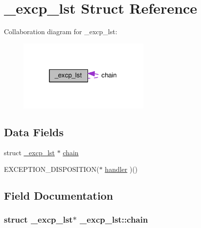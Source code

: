 \hypertarget{struct__excp__lst}{}\section{\+\_\+excp\+\_\+lst Struct Reference}
\label{struct__excp__lst}


Collaboration diagram for \+\_\+excp\+\_\+lst\+:\nopagebreak
\begin{figure}[H]
\begin{center}
\leavevmode
\includegraphics[width=184pt]{struct__excp__lst__coll__graph}
\end{center}
\end{figure}
\subsection*{Data Fields}
\begin{DoxyCompactItemize}
\item 
struct \hyperlink{struct__excp__lst}{\+\_\+excp\+\_\+lst} $\ast$ \hyperlink{struct__excp__lst_af3aa96f46675863a93c104985a99b44f}{chain}
\item 
E\+X\+C\+E\+P\+T\+I\+O\+N\+\_\+\+D\+I\+S\+P\+O\+S\+I\+T\+I\+ON($\ast$ \hyperlink{struct__excp__lst_a1e1e0c071255497025a22a693efc487c}{handler} )()
\end{DoxyCompactItemize}


\subsection{Field Documentation}
\subsubsection[{\texorpdfstring{chain}{chain}}]{\setlength{\rightskip}{0pt plus 5cm}struct {\bf \+\_\+excp\+\_\+lst}$\ast$ \+\_\+excp\+\_\+lst\+::chain}\hypertarget{struct__excp__lst_af3aa96f46675863a93c104985a99b44f}{}\label{struct__excp__lst_af3aa96f46675863a93c104985a99b44f}
